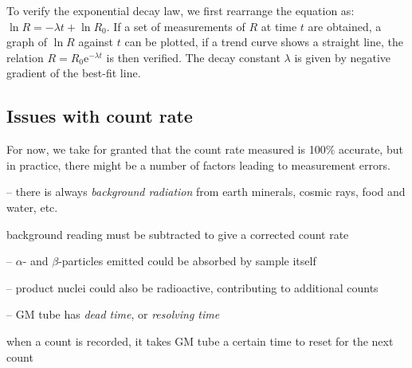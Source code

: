 \begin{marginfigure}
	\vspace*{-8pt}
	\centering
	\vspace*{-12pt}
\end{marginfigure}

To verify the exponential decay law, we first rearrange the equation as: $\ln R = -\lambda t + \ln R_0$. If a set of measurements of $R$ at time $t$ are obtained, a graph of $\ln R$ against $t$ can be plotted, if a trend curve shows a straight line, the relation $R=R_0\mathrm{e}^{-\lambda t}$ is then verified. The decay constant $\lambda$ is given by negative gradient of the best-fit line.

\subsection*{Issues with count rate}

For now, we take for granted that the count rate measured is 100\% accurate, but in practice, there might be a number of factors leading to measurement errors.

\begin{compactenum}
	\item[--] there is always \emph{background radiation} from earth minerals, cosmic rays, food and water, etc.
	
	background reading must be subtracted to give a corrected count rate
	
	\item[--] $\alpha$- and $\beta$-particles emitted could be absorbed by sample itself
	
	\item[--] product nuclei could also be radioactive, contributing to additional counts
	
	\item[--] GM tube has \emph{dead time}, or \emph{resolving time}
	
	when a count is recorded, it takes GM tube a certain time
	to reset for the next count
\end{compactenum}


